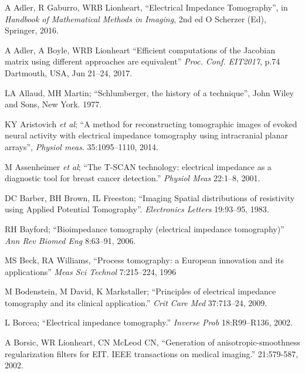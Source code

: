 \documentclass[10pt,journal]{IEEEtran}\def\TBLWIDA{15mm}\def\TBLWIDB{60mm}
\newcommand{\ifmaxthree}[2]{#2 {\em et al}; }
\begin{document}
\begin{thebibliography}{00}
A Adler, R Gaburro, WRB Lionheart,
``Electrical Impedance Tomography'',
 in {\em Handbook of Mathematical Methods in Imaging}, 2nd ed 
O Scherzer (Ed), Springer, 2016.

A Adler, A Boyle, WRB Lionheart
``Efficient computations of the Jacobian matrix using different approaches are equivalent''
{\em Proc. Conf. EIT2017}, p.74 Dartmouth, USA, Jun 21--24, 2017.

LA Allaud, MH Martin; 
``Schlumberger, the history of a technique'',
John Wiley and Sons, New York. 1977.

\ifmaxthree{
KY Aristovich, GS dos Santos, BC Packham, DS Holder. 
}{
KY Aristovich
}
``A method for reconstructing tomographic images of evoked neural activity with electrical impedance tomography using intracranial planar arrays'',
{\em Physiol meas}. 35:1095--1110, 2014.

\ifmaxthree{
M Assenheimer, O Laver-Moskovitz, D Malonek, D Manor, U Nahaliel, R Nitzan, A Saad
}{
M Assenheimer
}
``The T-SCAN technology: electrical impedance as a diagnostic tool for breast cancer detection.''
{\em Physiol Meas} 22:1--8, 2001. %

DC Barber, BH Brown, IL Freeston;
``Imaging Spatial distributions of resistivity using Applied Potential Tomography''.
{\em Electronics Letters} 19:93--95, 1983.


RH Bayford; 
``Bioimpedance tomography (electrical impedance tomography)''
{\em Ann Rev Biomed Eng} 8:63--91, 2006.

MS Beck, RA Williams,
``Process tomography: a European innovation and its applications''
{\em Meas Sci Technol} 7:215--224, 1996

M Bodenstein, M David, K Markstaller;
``Principles of electrical impedance tomography and its clinical application.''
{\em Crit Care Med} 37:713--24, 2009.

L Borcea;
``Electrical impedance tomography.''
{\em  Inverse Prob} 18:R99--R136, 2002.

A Borsic, WR Lionheart, CN McLeod CN,
``Generation of anisotropic-smoothness regularization filters for EIT. IEEE transactions on medical imaging.''
21:579-587, 2002.


\end{thebibliography}
\end{document}

